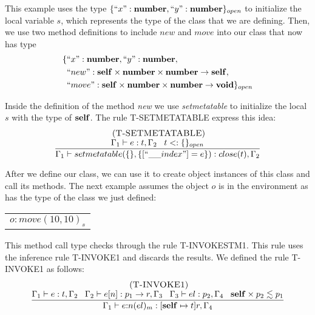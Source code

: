 This example uses the type $\{``x":\mathbf{number}, ``y":\mathbf{number}\}_{open}$ to
initialize the local variable $s$, which represents the type of the class
that we are defining.
Then, we use two method definitions to include $new$ and $move$ into
our class that now has type
\begin{align*}
\{ & ``x":\mathbf{number}, ``y":\mathbf{number},\\
   & ``new":\mathbf{self} \times \mathbf{number} \times \mathbf{number} \rightarrow \mathbf{self},\\
   & ``move":\mathbf{self} \times \mathbf{number} \times \mathbf{number} \rightarrow \mathbf{void} \}_{open}
\end{align*}

Inside the definition of the method \emph{new} we use \emph{setmetatable}
to initialize the local $s$ with the type of $\mathbf{self}$.
The rule \textsc{T-SETMETATABLE} express this idea:
\[
\begin{array}{c}
\mylabel{T-SETMETATABLE}\\
\dfrac{\env_{1} \vdash e:t, \env_{2} \;\;\;
       t \subtype \{\}_{open}}
      {\env_{1} \vdash setmetatable(\{\}, \{[``\string_\string_index"] = e\}):close(t), \env_{2}}
\end{array}
\]

After we define our class, we can use it to create object instances
of this class and call its methods.
The next example assumes the object $o$ is in the environment as
has the type of the class we just defined:
\begin{center}
\begin{tabular}{l}
$o{:}move(10, 10)_{s}$
\end{tabular}
\end{center}

This method call type checks through the rule \textsc{T-INVOKESTM1}.
This rule uses the inference rule \textsc{T-INVOKE1} and discards the results.
We defined the rule \textsc{T-INVOKE1} as follows:
\[
\begin{array}{c}
\; (\textsc{T-INVOKE1})\\
\dfrac{\Gamma_{1} \vdash e:t, \Gamma_{2} \;\;\;
       \Gamma_{2} \vdash e[n]:p_{1} \rightarrow r, \Gamma_{3} \;\;\;
       \Gamma_{3} \vdash el:p_{2}, \Gamma_{4} \;\;\;
       \mathbf{self} \times p_{2} \lesssim p_{1}}
      {\Gamma_{1} \vdash e{:}n(el)_{m}:[\mathbf{self} \mapsto t]r, \Gamma_{4}}
\end{array}
\]

